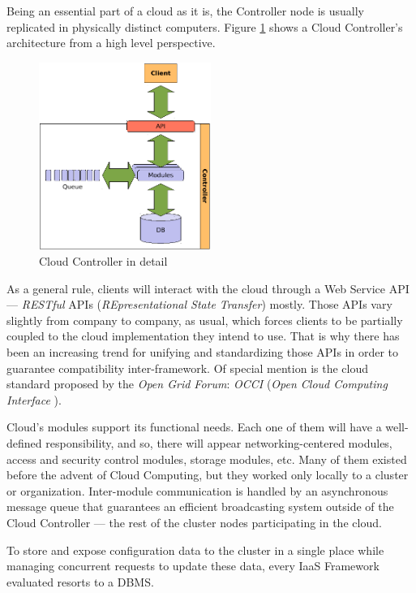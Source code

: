 Being an essential part of a cloud as it is, the Controller node is usually replicated in physically distinct computers. Figure \ref{fig:cloudcontroller} shows a Cloud Controller's architecture from a high level perspective.

\begin{figure}[tbp]
\begin{center}
\includegraphics[width=0.5\textwidth]{imagenes/005.pdf}
 \caption{Cloud Controller in detail}
\label{fig:cloudcontroller}
\end{center}
\end{figure}

As a general rule, clients will interact with the cloud through a Web Service API --- \emph{RESTful} APIs (\emph{REpresentational State Transfer}) mostly. Those APIs vary slightly from company to company, as usual, which forces clients to be partially coupled to the cloud implementation they intend to use. That is why there has been an increasing trend for unifying and standardizing those APIs in order to guarantee compatibility inter-framework. Of special mention is the cloud standard proposed by the \emph{Open Grid Forum}: \emph{OCCI} (\emph{Open Cloud Computing Interface} \cite{occisdraft}).

Cloud's modules support its functional needs. Each one of them will have a well-defined responsibility, and so, there will appear networking-centered modules, access and security control modules, storage modules, etc. Many of them existed before the advent of Cloud Computing, but they worked only locally to a cluster or organization. Inter-module communication is handled by an asynchronous message queue that guarantees an efficient broadcasting system outside of the Cloud Controller --- the rest of the cluster nodes participating in the cloud.

To store and expose configuration data to the cluster in a single place while managing concurrent requests to update these data, every IaaS Framework evaluated resorts to a DBMS.

